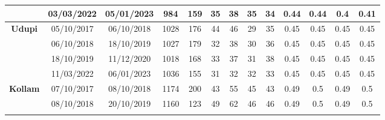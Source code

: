 \begin{table}[]
\begin{tabular}{|c|cc|cc|cccc|cccc|}
                                      & \multicolumn{1}{c|}{03/03/2022}          & 05/01/2023        & \multicolumn{1}{c|}{984}            & 159           & \multicolumn{1}{c|}{35}     & \multicolumn{1}{c|}{38}     & \multicolumn{1}{c|}{35}     & 34     & \multicolumn{1}{c|}{0.44}   & \multicolumn{1}{c|}{0.44}   & \multicolumn{1}{c|}{0.4}    & 0.41   \\ \hline
\multirow{4}{*}{\textbf{Udupi}}       & \multicolumn{1}{c|}{05/10/2017}          & 06/10/2018        & \multicolumn{1}{c|}{1028}           & 176           & \multicolumn{1}{c|}{44}     & \multicolumn{1}{c|}{46}     & \multicolumn{1}{c|}{29}     & 35     & \multicolumn{1}{c|}{0.45}   & \multicolumn{1}{c|}{0.45}   & \multicolumn{1}{c|}{0.45}   & 0.45   \\ \cline{2-13} 
                                      & \multicolumn{1}{c|}{06/10/2018}          & 18/10/2019        & \multicolumn{1}{c|}{1027}           & 179           & \multicolumn{1}{c|}{32}     & \multicolumn{1}{c|}{38}     & \multicolumn{1}{c|}{30}     & 36     & \multicolumn{1}{c|}{0.45}   & \multicolumn{1}{c|}{0.45}   & \multicolumn{1}{c|}{0.45}   & 0.45   \\ \cline{2-13} 
                                      & \multicolumn{1}{c|}{18/10/2019}          & 11/12/2020        & \multicolumn{1}{c|}{1018}           & 168           & \multicolumn{1}{c|}{33}     & \multicolumn{1}{c|}{37}     & \multicolumn{1}{c|}{31}     & 38     & \multicolumn{1}{c|}{0.45}   & \multicolumn{1}{c|}{0.45}   & \multicolumn{1}{c|}{0.45}   & 0.45   \\ \cline{2-13} 
                                      & \multicolumn{1}{c|}{11/03/2022}          & 06/01/2023        & \multicolumn{1}{c|}{1036}           & 155           & \multicolumn{1}{c|}{31}     & \multicolumn{1}{c|}{32}     & \multicolumn{1}{c|}{32}     & 33     & \multicolumn{1}{c|}{0.45}   & \multicolumn{1}{c|}{0.45}   & \multicolumn{1}{c|}{0.45}   & 0.45   \\ \hline
\multirow{5}{*}{\textbf{Kollam}}      & \multicolumn{1}{c|}{07/10/2017}          & 08/10/2018        & \multicolumn{1}{c|}{1174}           & 200           & \multicolumn{1}{c|}{43}     & \multicolumn{1}{c|}{55}     & \multicolumn{1}{c|}{45}     & 43     & \multicolumn{1}{c|}{0.49}   & \multicolumn{1}{c|}{0.5}    & \multicolumn{1}{c|}{0.49}   & 0.5    \\ \cline{2-13} 
                                      & \multicolumn{1}{c|}{08/10/2018}          & 20/10/2019        & \multicolumn{1}{c|}{1160}           & 123           & \multicolumn{1}{c|}{49}     & \multicolumn{1}{c|}{62}     & \multicolumn{1}{c|}{46}     & 46     & \multicolumn{1}{c|}{0.49}   & \multicolumn{1}{c|}{0.5}    & \multicolumn{1}{c|}{0.49}   & 0.5    \\ \cline{2-13} 

\end{tabular}
\end{table}
